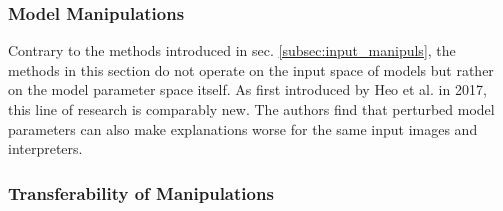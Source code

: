 \subsubsection{Model Manipulations}
Contrary to the methods introduced in sec. \autoref{subsec:input_manipuls}, the methods in this section do not operate on the input space of models but rather on the model parameter space itself. 
As first introduced by Heo et al. \cite{fooling_nn_interpreters} in 2017, this line of research is comparably new. The authors find that perturbed model parameters can also make explanations worse for the same input images and interpreters. 


\subsubsection{Transferability of Manipulations}